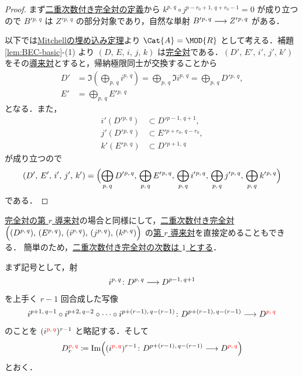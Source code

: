 \documentclass[algtopo_main]{subfiles}
\begin{document}
\begin{proof}
    まず\hyperref[def:BEC]{二重次数付き完全対の定義}から $k^{p,\, q} \circ j^{p-r_0+1,\, q+r_0-1} = 0$ が成り立つので $B'{}^{p,\, q}$ は $Z'{}^{p,\, q}$ の部分対象であり，自然な単射 $B'{}^{p,\, q} \longrightarrow Z'{}^{p,\, q}$ がある．

    以下では\hyperref[thm:embedding]{Mitchellの埋め込み定理}より $\Cat{A} =\MOD{R}$ として考える．補題\ref{lem:BEC-basic}-(1) より
    $ (D,\, E,\, i,\, j,\, k)$
    は\hyperref[def:exact-couple]{完全対}である．$(D',\, E',\, i',\, j',\, k')$ をその\hyperref[prop:derived-couple]{導来対}とすると，帰納極限同士が交換することから
    \begin{align}
        D' &= \Im \left( \bigoplus_{p,\, q} i^{p,\, q} \right)  = \bigoplus_{p,\, q} \Im i^{p,\, q} = \bigoplus_{p,\, q} D'{}^{p,\, q}, \\
        E' &= \bigoplus_{p,\, q} E'{}^{p,\, q}
    \end{align}
    となる．また，
    \begin{align}
        i'(D'{}^{p,\, q})&\subset D'{}^{p-1,\, q+1}, \\
        j'(D'{}^{p,\, q})&\subset E'{}^{p+r_0,\, q-r_0}, \\
        k'(E'{}^{p,\, q})&\subset D'{}^{p+1,\, q}
    \end{align}
    が成り立つので
    \begin{align}
        (D',\, E',\, i',\, j',\, k') = \Bigl( \bigoplus_{p,\, q} D'{}^{p,\, q},\, \bigoplus_{p,\, q} E'{}^{p,\, q},\, \bigoplus_{p,\, q} i'{}^{p,\, q},\, \bigoplus_{p,\, q} j'{}^{p,\, q},\, \bigoplus_{p,\, q} k'{}^{p,\, q} \Bigr)
    \end{align}
    である．
\end{proof}

\hyperref[prop:DC-rth]{完全対の第 $r$ 導来対}の場合と同様にして，\hyperref[def:BEC]{二重次数付き完全対}  $\Bigl( (D^{p,\, q}),\, (E^{p,\, q}),\, (i^{p,\, q}),\, (j^{p,\, q}),\, (k^{p,\, q}) \Bigr)$ の\hyperref[def:DC-BEC]{第 $r$ 導来対}を直接定めることもできる．
簡単のため，\underline{二重次数付き完全対の次数は $1$ とする}．

まず記号として，射
\begin{align}
    i^{p,\, q} \colon D^{p,\, q} \longrightarrow D^{p-1,\, q+1}
\end{align}
を上手く $r-1$ 回合成した写像
\begin{align}
    i^{p+1,\, q-1} \circ i^{p+2,\, q-2} \circ \cdots \circ i^{p+(r-1),\, q-(r-1)} \colon D^{p+(r-1),\, q-(r-1)} \longrightarrow D^{\textcolor{red}{p,\, q}}
\end{align}
のことを $(i^{\textcolor{red}{p,\, q}})^{r-1}$ と略記する．そして
\begin{align}
    D_r^{\textcolor{red}{p,\, q}} \coloneqq \Im \Bigl((i^{\textcolor{red}{p,\, q}})^{r-1} \colon D^{p+(r-1),\, q-(r-1)} \longrightarrow D^{\textcolor{red}{p,\, q}} \Bigr)
\end{align}
とおく．
\end{document}
